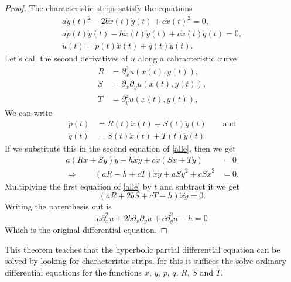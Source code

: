 \begin{proof}
The characteristic strips satisfy the equations
\begin{equation}
\begin{gathered}
a\dot y(t)^2-2b\dot x(t)\dot y(t)+c\dot x(t)^2=0,
\\
a\dot p(t)\dot y(t)-h\dot x(t)\dot y(t)+c\dot x(t)\dot q(t)=0,
\\
\dot u(t)=p(t)\dot x(t)+q(t)\dot y(t).
\end{gathered}
\label{alle}
\end{equation}
Let's call the second derivatives of $u$ along a cahracteristic curve
\begin{align*}
R&=\partial_x^2u(x(t),y(t)),
\\
S&=\partial_x\partial_yu(x(t),y(t)),
\\
T&=\partial_y^2u(x(t),y(t)),
\end{align*}
We can write
\begin{align*}
\dot p(t)&=R(t)\dot x(t)+S(t)\dot y(t)\qquad\text{and}\\
\dot q(t)&=S(t)\dot x(t)+T(t)\dot y(t)
\end{align*}
If we substitute this in the second equation of \eqref{alle}, then we get
\begin{align*}
a(R\dot x+S\dot y)\dot y-h\dot x\dot y+c\dot x(S\dot x+T\dot y)&=0
\\
\Rightarrow \qquad(aR-h+cT)\dot x\dot y+aS\dot y^2 +cS \dot x^2&=0.
\end{align*}
Multiplying the first equation of
\eqref{alle} by $t$ and subtract it we get
\[
(aR+2bS+cT-h)\dot x\dot y=0.
\]
Writing the parenthesis out is
\[
a\partial_x^2u+2b\partial_x\partial_yu+c\partial_y^2u-h=0
\]
Which is the original differential equation.
\end{proof}
This theorem teaches that the hyperbolic partial differential equation
can be solved by looking for characteristic strips.
for this it suffices the solve ordinary differential equations for the
functions $x$, $y$, $p$, $q$, $R$, $S$ and $T$.


